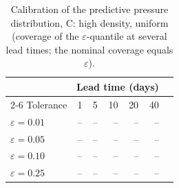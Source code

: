 \begin{table}[htbp]
\centering
\caption{Calibration of the predictive pressure distribution, C: high density, uniform
(coverage of the $\varepsilon$-quantile at several lead times; the nominal
coverage equals $\varepsilon$).}
\label{tab:ch6-calibration-C}
\begin{tabular}{@{}lrrrrrr@{}}
\toprule
& \multicolumn{5}{c}{Lead time (days)} \\
\cmidrule(r){2-6}
Tolerance & 1 & 5 & 10 & 20 & 40 \\
\midrule

$\varepsilon=0.01$ & -- & -- & -- & -- & -- \\
$\varepsilon=0.05$ & -- & -- & -- & -- & -- \\
$\varepsilon=0.10$ & -- & -- & -- & -- & -- \\
$\varepsilon=0.25$ & -- & -- & -- & -- & -- \\
\bottomrule
\end{tabular}
\end{table}

